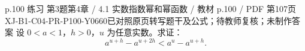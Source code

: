 \par\noindent\begin{minipage}{\linewidth}
\begin{bankitem}{p.100 练习 第3题}{第4章 / 4.1 实数指数幂和幂函数 / 教材 p.100 / PDF 第107页}{XJ-B1-C04-PR-P100-Y0660}{已对照原页转写题干及公式；待教师复核；未制作答案}
设 $0<a<1$，$h>0$，$u$ 为任意实数。求证：
\[a^{u+h}-a^{u+2h}<a^u-a^{u+h}.\]
\end{bankitem}
\end{minipage}\par\medskip
